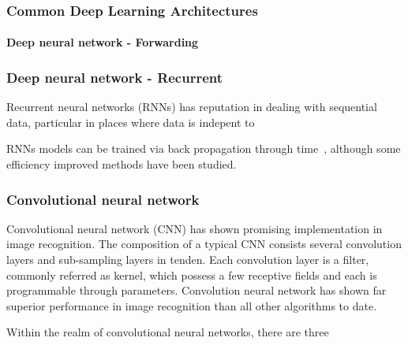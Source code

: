 \subsubsection{Common Deep Learning Architectures}

\paragraph{Deep neural network - Forwarding}
\subsubsection{Deep neural network - Recurrent}
Recurrent neural networks (RNNs) has reputation in dealing with sequential data, particular in places where data is indepent to 

RNNs models can be trained via back propagation through time~\cite{Goodfellow-et-al-2016}, although some efficiency improved methods have been studied.~\cite{963769,neco.1989,Gomez:2008:ANE:1390681.1390712}

\subsubsection{Convolutional neural network}
Convolutional neural network (CNN) has shown promising implementation in image recognition. The composition of a typical CNN consists several convolution layers and sub-sampling layers in tenden. Each convolution layer is a filter, commonly referred as kernel, which possess a few receptive fields and each is programmable through parameters.  
Convolution neural network has shown far superior performance in image recognition than all other algorithms to date.~\cite{Szegedy_2015}
\par 
Within the realm of convolutional neural networks, there are three